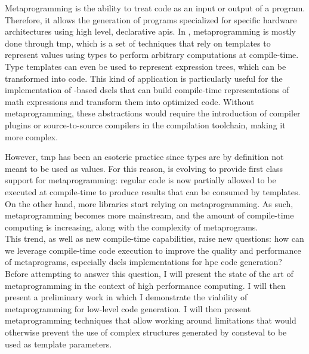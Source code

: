 \documentclass[main]{subfiles}
\begin{document}
Metaprogramming is the ability to treat code as an input or output of a program.
Therefore, it allows the generation of programs specialized for
specific hardware architectures using high level, declarative \glspl{api}.
In \cpp, metaprogramming is mostly done through \gls{tmp}, which is a set of
techniques that rely on \cpp templates to represent values using types to
perform arbitrary computations at compile-time.
Type templates can even be used to represent expression trees,
which can be transformed into code. This kind of application is particularly
useful for the implementation of \cpp-based \glspl{dsel} that can build
compile-time representations of math expressions and transform them into
optimized code. Without metaprogramming, these abstractions would require
the introduction of compiler plugins or source-to-source compilers in the
compilation toolchain, making it more complex.

However, \gls{tmp} has been an esoteric practice since types are by definition
not meant to be used as values. For this reason, \cpp is evolving to provide
first class support for metaprogramming: regular \cpp code is now partially
allowed to be executed at compile-time to produce results that can be consumed
by templates. On the other hand, more \cpp libraries start relying on \cpp
metaprogramming. As such, \cpp metaprogramming becomes more mainstream,
and the amount of compile-time computing is increasing, along with
the complexity of \cpp metaprograms.
\\


This trend, as well as new \cpp compile-time capabilities, raise new questions:
how can we leverage compile-time \cpp code execution to improve the quality
and performance of \cpp metaprograms, especially \glspl{dsel} implementations
for \acrlong{hpc} code generation?
\\

Before attempting to answer this question, I will present the state of the art
of metaprogramming in the context of high performance computing.
I will then present a preliminary work in which I demonstrate the viability
of \cpp metaprogramming for low-level code generation.
I will then present metaprogramming techniques that allow working around
\cpp limitations that would otherwise prevent the use of complex structures
generated by \gls{consteval} to be used as template parameters.
\end{document}
